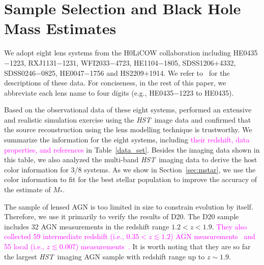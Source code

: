 \documentclass[fleqn,usenatbib]{mnras}
\newcommand{\hst}{{\it HST}}
\newcommand{\mstar}{{$M_*$}}
\newcommand{\pink}[1]{{\textcolor{magenta}{#1}}}
\begin{document}
\section{Sample Selection and Black Hole Mass Estimates}\label{sec:sample_select}
We adopt eight lens systems from the H0LiCOW collaboration including HE0435$-$1223, RXJ1131$-$1231, WFI2033$-$4723, HE1104$-$1805, SDSS1206$+$4332, SDSS0246$-$0825, HE0047$-$1756 and HS2209$+$1914. We refer to~\citet{Suyu2017, Ding2017a} for the descriptions of these data. For conciseness, in the rest of this paper, we abbreviate each lens name to four digits (e.g., HE0435$-$1223 to HE0435). 

Based on the observational data of these eight systems, \citet{Ding2017a} performed an extensive and realistic simulation exercise using the \hst\ image data and confirmed that the source reconstruction using the lens modelling technique is trustworthy. We summarize the information for the eight systems, including \pink{their redshift, data properties, and references} in Table~\ref{data_set}.
Besides the imaging data shown in this table, we also analyzed the multi-band \hst\ imaging data to derive the host color information for 3/8 systems. As we show in Section~\ref{sec:mstar}, we use the color information to fit for the best stellar population to improve the accuracy of the estimate of \mstar. 

The sample of lensed AGN is too limited in size to constrain evolution by itself. Therefore, we use it primarily to verify the results of D20.  The D20 sample includes 32 AGN measurements in the redshift range $1.2<z<1.9$. \pink{They also collected 59 intermediate redshift (i.e., $0.35<z\lesssim1.2$) AGN measurements~\citep{Bennert11, SS13, Cisternas2011} and 55 local (i.e., $z\lesssim0.007$) measurements~\citep{Bennert++2011, H+R04}.} It is worth noting that they are so far the largest \hst\ imaging AGN sample with redshift range up to $z\sim1.9$. 
 
\end{document}

